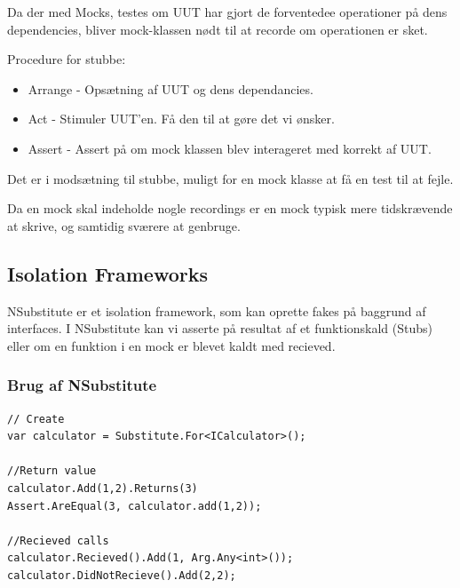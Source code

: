 Da der med Mocks, testes om UUT har gjort de forventedee operationer på dens dependencies, bliver mock-klassen nødt til at recorde om operationen er sket.

Procedure for stubbe:
\begin{itemize}
	\item Arrange - Opsætning af UUT og dens dependancies.
	\item Act - Stimuler UUT'en. Få den til at gøre det vi ønsker.
	\item Assert - Assert på om mock klassen blev interageret med korrekt af UUT.
\end{itemize}

Det er i modsætning til stubbe, muligt for en mock klasse at få en test til at fejle.

Da en mock skal indeholde nogle recordings er en mock typisk mere tidskrævende at skrive, og samtidig sværere at genbruge.


\subsection{Isolation Frameworks}

NSubstitute er et isolation framework, som kan oprette fakes på baggrund af interfaces. I NSubstitute kan vi asserte på resultat af et funktionskald (Stubs) eller om en funktion i en mock er blevet kaldt med recieved.

\subsubsection{Brug af NSubstitute}
\begin{lstlisting}
// Create
var calculator = Substitute.For<ICalculator>();

//Return value
calculator.Add(1,2).Returns(3)
Assert.AreEqual(3, calculator.add(1,2));

//Recieved calls
calculator.Recieved().Add(1, Arg.Any<int>());
calculator.DidNotRecieve().Add(2,2);

\end{lstlisting}
